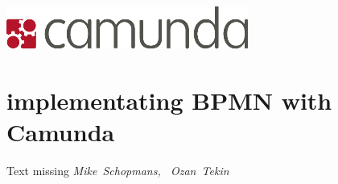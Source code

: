 \hfill\includegraphics[width=.5\linewidth]{images/camunda_logo.png}
\section*{implementating BPMN with Camunda}

Text missing 
\hfill\textit{Mike~Schopmans, ~Ozan~Tekin}

